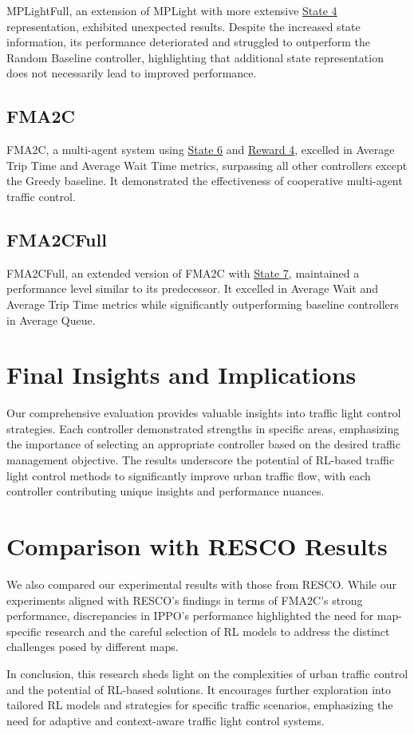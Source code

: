 MPLightFull, an extension of MPLight with more extensive \hyperref[subsec:state-4]{State 4} representation, exhibited unexpected results. Despite the increased state information, its performance deteriorated and struggled to outperform the Random Baseline controller, highlighting that additional state representation does not necessarily lead to improved performance.

\subsection{FMA2C}

FMA2C, a multi-agent system using \hyperref[subsec:state-6]{State 6} and \hyperref[subsec:reward-4]{Reward 4}, excelled in Average Trip Time and Average Wait Time metrics, surpassing all other controllers except the Greedy baseline. It demonstrated the effectiveness of cooperative multi-agent traffic control.

\subsection{FMA2CFull}

FMA2CFull, an extended version of FMA2C with \hyperref[subsec:state-7]{State 7}, maintained a performance level similar to its predecessor. It excelled in Average Wait and Average Trip Time metrics while significantly outperforming baseline controllers in Average Queue.

\section{Final Insights and Implications}

Our comprehensive evaluation provides valuable insights into traffic light control strategies. Each controller demonstrated strengths in specific areas, emphasizing the importance of selecting an appropriate controller based on the desired traffic management objective. The results underscore the potential of RL-based traffic light control methods to significantly improve urban traffic flow, with each controller contributing unique insights and performance nuances.

\section{Comparison with RESCO Results}

We also compared our experimental results with those from RESCO\cite{resco}. While our experiments aligned with RESCO's findings in terms of FMA2C's strong performance, discrepancies in IPPO's performance highlighted the need for map-specific research and the careful selection of RL models to address the distinct challenges posed by different maps.

In conclusion, this research sheds light on the complexities of urban traffic control and the potential of RL-based solutions. It encourages further exploration into tailored RL models and strategies for specific traffic scenarios, emphasizing the need for adaptive and context-aware traffic light control systems.
